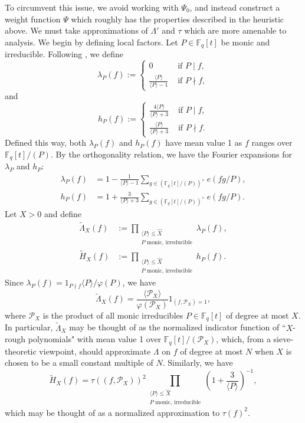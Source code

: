 \documentclass{article}
\theoremstyle{definition}
\theoremstyle{definition}
\theoremstyle{remark}
\newcommand{\F}{\mathbb{F}_q[t]}
\renewcommand\phi\varphi
\newcommand{\1}{\mathbf{1}}
\numberwithin{equation}{section}
\begin{document}
To circumvent this issue, we avoid working with $\Psi_0$, and instead construct a weight function $\Psi$ which roughly has the properties described in the heuristic above. We must take approximations of $\Lambda'$ and $\tau$ which are more amenable to analysis. We begin by defining local factors. Let $P \in \F$ be monic and irreducible. Following \cite{Green}, we define 
\[
\lambda_P(f):=
\begin{cases}
0 &\text{ if } P \mid f,\\[6pt]
\frac{\langle P \rangle }{\langle P \rangle - 1} &\text{ if } P \nmid f,
\end{cases}
\]
and 
\[
h_P(f):=
\begin{cases}
\frac{4\langle P \rangle}{\langle P \rangle + 3} &\text{ if } P \mid f,\\[6pt]
\frac{\langle P \rangle}{\langle P \rangle + 3} &\text{ if } P \nmid f.
\end{cases}
\]
Defined this way, both $\lambda_P(f)$ and $h_P(f)$ have mean value 1 as $f$ ranges over $\F/(P)$. By the orthogonality relation, we have the Fourier expansions for $\lambda_P$ and $h_P$:
\begin{align*}
\lambda_P(f) &= 1 - \frac{1}{\langle P \rangle - 1}\sum_{g \in (\F/(P))^\times} e(fg / P),\\
h_P(f) &= 1 + \frac{3}{\langle P \rangle + 3}\sum_{g \in (\F/(P))^\times} e(fg / P).
\end{align*}
Let $X>0$ and define 
\begin{align*}
\widetilde{\Lambda}_X(f)&:=\prod_{\substack{\langle P \rangle\leq \widehat{X}\\P\text{~monic, irreducible}}}\lambda_P(f),\\
\widetilde{H}_X(f)&:=\prod_{\substack{\langle P \rangle\leq \widehat{X}\\P\text{~monic, irreducible}}}h_P(f).
\end{align*}
Since $\lambda_P(f)=1_{P\nmid f}\langle P \rangle/\phi(P)$, we have
\[\widetilde{\Lambda}_X(f)=\frac{\langle \mathscr{P}_X \rangle}{\phi(\mathscr{P}_X)}1_{(f,\mathscr{P}_X)=1},\]
where $\mathscr{P}_X$ is the product of all monic irreducibles $P\in\F$ of degree at most $X$. In particular, $\widetilde{\Lambda}_X$ may be thought of as the normalized indicator function of ``$X$-rough polynomials" with mean value 1 over $\F/(\mathscr{P}_X)$, which, from a sieve-theoretic viewpoint, should approximate $\Lambda$ on $f$ of degree at most $N$ when $X$ is chosen to be a small constant multiple of $N$. Similarly, we have
\[\widetilde{H}_X(f)=\tau((f,\mathscr{P}_X))^2\prod_{\substack{\langle P \rangle\leq \widehat{X}\\P\text{~monic, irreducible}}}\left(1+\frac{3}{\langle P \rangle}\right)^{-1},\]
which may be thought of as a normalized approximation to $\tau(f)^2$.
\end{document}
